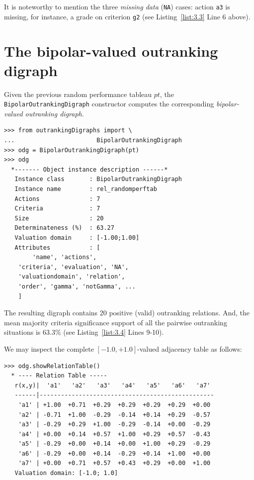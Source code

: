 It is noteworthy to mention the three \emph{missing data} (\texttt{NA}) cases: action \texttt{a3} is missing, for instance, a grade on criterion \texttt{g2} (see Listing~\ref{list:3.3} Line 6 above).
    
\section{The bipolar-valued outranking digraph}
\label{sec:3.2}

Given the previous random performance tableau $pt$, the {\tt BipolarOutrankingDigraph} constructor computes the corresponding \emph{bipolar-valued outranking digraph}. 
\begin{lstlisting}[caption={Example of random bipolar-valued outranking digraph.},label=list:3.4]
>>> from outrankingDigraphs import \
...                       BipolarOutrankingDigraph
>>> odg = BipolarOutrankingDigraph(pt)
>>> odg
  *------- Object instance description ------*
   Instance class       : BipolarOutrankingDigraph
   Instance name        : rel_randomperftab
   Actions              : 7
   Criteria             : 7
   Size                 : 20
   Determinateness (%)  : 63.27
   Valuation domain     : [-1.00;1.00]
   Attributes           : [
        'name', 'actions', 
	'criteria', 'evaluation', 'NA',
	'valuationdomain', 'relation', 
	'order', 'gamma', 'notGamma', ...
	]
\end{lstlisting}
The resulting digraph contains 20 positive (valid) outranking relations. And, the mean majority criteria significance support of all the pairwise outranking situations is $63.3\%$ (see Listing~\ref{list:3.4}  Lines 9-10).

We may inspect the complete $[-1.0,+1.0]$-valued adjacency table as follows:
\begin{lstlisting}[caption={Inspecting the valued adjacency table.},label=list:3.5]
>>> odg.showRelationTable()
  * ---- Relation Table -----
   r(x,y)|  'a1'   'a2'   'a3'   'a4'   'a5'   'a6'   'a7'   
   ------|-------------------------------------------------
    'a1' | +1.00  +0.71  +0.29  +0.29  +0.29  +0.29  +0.00  
    'a2' | -0.71  +1.00  -0.29  -0.14  +0.14  +0.29  -0.57  
    'a3' | -0.29  +0.29  +1.00  -0.29  -0.14  +0.00  -0.29  
    'a4' | +0.00  +0.14  +0.57  +1.00  +0.29  +0.57  -0.43  
    'a5' | -0.29  +0.00  +0.14  +0.00  +1.00  +0.29  -0.29  
    'a6' | -0.29  +0.00  +0.14  -0.29  +0.14  +1.00  +0.00  
    'a7' | +0.00  +0.71  +0.57  +0.43  +0.29  +0.00  +1.00  
   Valuation domain: [-1.0; 1.0]
\end{lstlisting}

